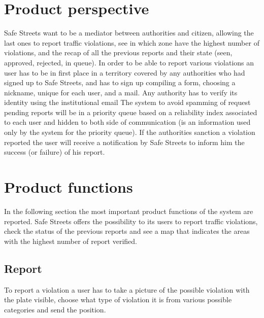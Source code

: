 \documentclass[12pt,a4paper]{report}
\begin{document}
	\section{Product perspective}
		Safe Streets want to be a mediator between authorities and citizen, allowing the last ones to report traffic violations, see
		in which zone have the highest number of violations, and the recap of all the previous reports and their state
		(seen, approved, rejected, in queue). In order to be able to report various violations an user has to be in first place in a
		territory covered by any authorities who had signed up to Safe Streets, and has to sign up compiling a form, choosing a
		nickname, unique for each user, and a mail. Any authority has to verify its identity using the institutional email 
		The system to avoid spamming of request pending reports will be in a priority queue based 
		on a reliability index associated to each user and hidden to both side of communication (is an information used only by 
		the system for the priority queue). If the authorities sanction a violation reported the user 
		will receive a notification by Safe Streets to inform him the success (or failure) of his report. 
	\section{Product functions}
		In the following section the most important product functions of the system are reported.
		Safe Streets offers the possibility to its users to report traffic violations, check the status of the previous reports and see 
		a map that indicates the areas with the highest number of report verified.
		\subsection{Report}
			To report a violation a user has to take a picture of the possible violation with the plate visible, choose what type of
			violation it is from various possible categories and send the position.
\end{document}
